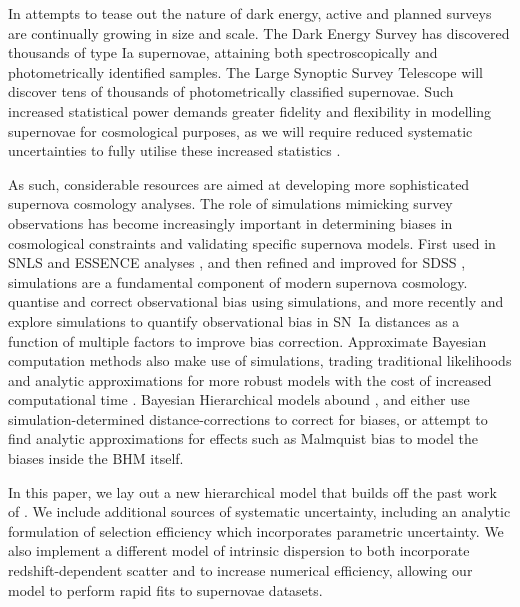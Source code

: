 \documentclass[a4paper,fleqn,usenatbib,manuscript]{emulateapj}
\begin{document}
In attempts to tease out the nature of dark energy, active and planned surveys are continually growing in size and scale. The Dark Energy Survey \citep[DES,][]{Bernstein2012, Abbott2016} has discovered thousands of type Ia supernovae, attaining both spectroscopically and photometrically identified samples. The Large Synoptic Survey Telescope \citep[LSST,][]{Ivezic2008, LSSTScienceCollaboration2009} will discover tens of thousands of photometrically classified supernovae. Such increased statistical power demands greater fidelity and flexibility in modelling supernovae for cosmological purposes, as we will require reduced systematic uncertainties to fully utilise these increased statistics \citep{Betoule2014, Scolnic2017}.


As such, considerable resources are aimed at developing more sophisticated supernova cosmology analyses. The role of simulations mimicking survey observations has become increasingly important in determining biases in cosmological constraints and validating specific supernova models. First used in SNLS \citep{Astier2006} and ESSENCE analyses \citep{Wood-Vasey2007}, and then refined and improved for SDSS \citep{Kessler2009}, simulations are a fundamental component of modern supernova cosmology.  \citet{Betoule2014} quantise and correct observational bias using simulations, and more recently \citet{Scolnic2016} and \citet{Kessler2017} explore simulations to quantify observational bias in SN~Ia distances as a function of multiple factors to improve bias correction. Approximate Bayesian computation methods also make use of simulations, trading traditional likelihoods and analytic approximations for more robust models with the cost of increased computational time \citep{Weyant2013, Jennings2016}. Bayesian Hierarchical models abound \citep{Mandel2009, March2011, March2014, Rubin2015, Shariff2016, Roberts2017}, and either use simulation-determined distance-corrections to correct for biases, or attempt to find analytic approximations for effects such as Malmquist bias to model the biases inside the BHM itself.



In this paper, we lay out a new hierarchical model that builds off the past work of \citet{Rubin2015}. We include additional sources of systematic uncertainty, including an analytic formulation of selection efficiency which incorporates parametric uncertainty. We also implement a different model of intrinsic dispersion to both incorporate redshift-dependent scatter and to increase numerical efficiency, allowing our model to perform rapid fits to supernovae datasets.
\end{document}
